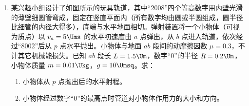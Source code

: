 \documentclass[\gkver]{gaokaozhenti}
\begin{document}
\begin{enumerate}
{\begin{enumerate}
	\item
	$1500$，$0.90$
	
	\item
	在 $0\sim0.2\UT$ 范围内，磁敏电阻的阻值随磁感应强度非线性变化（或不均匀变化）；在 $0.4\sim1.0\UT$ 范围内，磁敏电阻的阻值随磁感应强度线性变化（或均匀变化）。
	
	\item
	磁场反向，磁敏电阻的阻值不变。
\end{enumerate}
}


\item
某兴趣小组设计了如图所示的玩具轨道，其中“2008”四个等高数字用内壁光滑的薄壁细圆管弯成，固定在竖直平面内（所有数字均由圆或半圆组成，圆半径比细管的内径大得多），底端与水平地面相切。弹射装置将一个小物体（可视为质点）以 $v_{a}=5\Ums$ 的水平初速度由 $a$ 点弹出，从 $b$ 点进入轨道，依次经过“8002”后从 $p$ 点水平抛出。小物体与地面 $ab$ 段间的动摩擦因数 $\mu=0.3$，不计其它机械能损失。已知 $ab$ 段长 $L=1.5\Um$，数字“0”的半径 $R=0.2\Um$，小物体质量 $m=0.01\Ukg$，$g=10\Umsq$。求：

\begin{enumerate}
	\item
	小物体从 $p$ 点抛出后的水平射程。
	\item
	小物体经过数字“0”的最高点时管道对小物体作用力的大小和方向。
\end{enumerate}




\end{enumerate}
\end{document}

